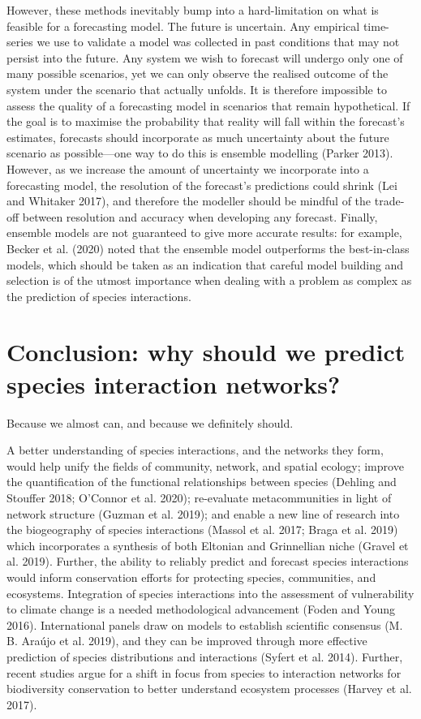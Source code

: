 \documentclass[10pt,oneside]{article}
\begin{document}
However, these methods inevitably bump into a hard-limitation on what is
feasible for a forecasting model. The future is uncertain. Any empirical
time-series we use to validate a model was collected in past conditions
that may not persist into the future. Any system we wish to forecast
will undergo only one of many possible scenarios, yet we can only
observe the realised outcome of the system under the scenario that
actually unfolds. It is therefore impossible to assess the quality of a
forecasting model in scenarios that remain hypothetical. If the goal is
to maximise the probability that reality will fall within the forecast's
estimates, forecasts should incorporate as much uncertainty about the
future scenario as possible---one way to do this is ensemble modelling
(Parker 2013). However, as we increase the amount of uncertainty we
incorporate into a forecasting model, the resolution of the forecast's
predictions could shrink (Lei and Whitaker 2017), and therefore the
modeller should be mindful of the trade-off between resolution and
accuracy when developing any forecast. Finally, ensemble models are not
guaranteed to give more accurate results: for example, Becker et al.
(2020) noted that the ensemble model outperforms the best-in-class
models, which should be taken as an indication that careful model
building and selection is of the utmost importance when dealing with a
problem as complex as the prediction of species interactions.

\hypertarget{conclusion-why-should-we-predict-species-interaction-networks}{%
\section{Conclusion: why should we predict species interaction
networks?}\label{conclusion-why-should-we-predict-species-interaction-networks}}

Because we almost can, and because we definitely should.

A better understanding of species interactions, and the networks they
form, would help unify the fields of community, network, and spatial
ecology; improve the quantification of the functional relationships
between species (Dehling and Stouffer 2018; O'Connor et al. 2020);
re-evaluate metacommunities in light of network structure (Guzman et al.
2019); and enable a new line of research into the biogeography of
species interactions (Massol et al. 2017; Braga et al. 2019) which
incorporates a synthesis of both Eltonian and Grinnellian niche (Gravel
et al. 2019). Further, the ability to reliably predict and forecast
species interactions would inform conservation efforts for protecting
species, communities, and ecosystems. Integration of species
interactions into the assessment of vulnerability to climate change is a
needed methodological advancement (Foden and Young 2016). International
panels draw on models to establish scientific consensus (M. B. Araújo et
al. 2019), and they can be improved through more effective prediction of
species distributions and interactions (Syfert et al. 2014). Further,
recent studies argue for a shift in focus from species to interaction
networks for biodiversity conservation to better understand ecosystem
processes (Harvey et al. 2017).
\end{document}
